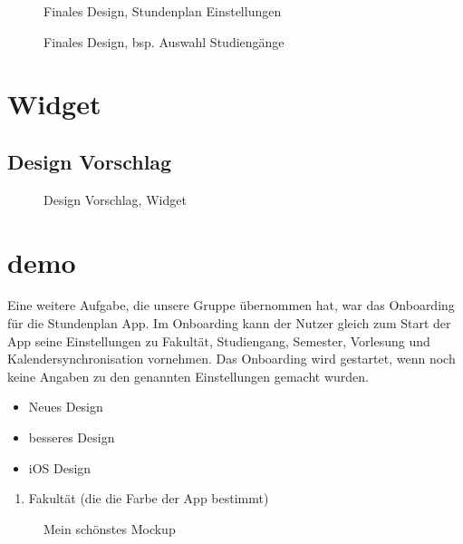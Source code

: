 \begin{figure}[H]
	\centering
	\caption{Finales Design, Stundenplan Einstellungen}
	\label{fig1}
\end{figure}

\begin{figure}[H]
	\centering
	\caption{Finales Design, bsp. Auswahl Studiengänge}
	\label{fig1}
\end{figure}

\section{Widget}

\subsection{Design Vorschlag}

\begin{figure}[H]
	\centering
	\caption{Design Vorschlag, Widget}
	\label{fig1}
\end{figure}




\section{demo}
Eine weitere Aufgabe, die unsere Gruppe übernommen hat, war das Onboarding für die Stundenplan App. Im Onboarding kann der Nutzer gleich zum Start der App seine Einstellungen zu Fakultät, Studiengang, Semester, Vorlesung und Kalendersynchronisation vornehmen. Das Onboarding wird gestartet, wenn noch keine Angaben zu den genannten Einstellungen gemacht wurden.

\begin{itemize}
\item Neues Design
\item besseres Design
\item iOS Design
\end{itemize}

\begin{enumerate}
\item Fakultät (die die Farbe der App bestimmt)
\end{enumerate}

\begin{figure}[ht]
	\centering
	\caption{Mein schönstes Mockup}
	\label{fig2}
\end{figure}

